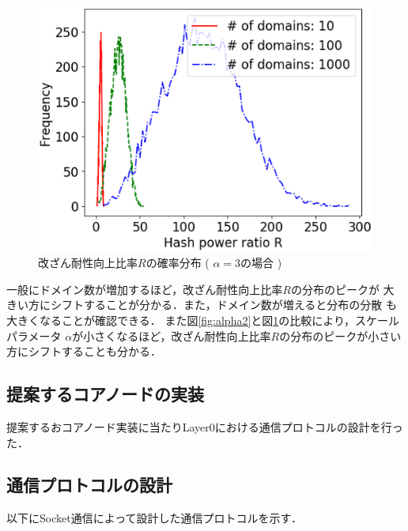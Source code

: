 \documentclass[a4paper,12pt]{jsarticle}
\begin{document}
\begin{figure}[tbh]
  \begin{center}
    \includegraphics{pht/hist-comp-R-alpha3.0-m1.0.eps}
  \end{center}
  \caption{改ざん耐性向上比率$R$の確率分布 ( $\alpha=3$の場合 ) }
  \label{fig:alpha3}
\end{figure}
%
一般にドメイン数が増加するほど，改ざん耐性向上比率$R$の分布のピークが
大きい方にシフトすることが分かる．また，ドメイン数が増えると分布の分散
も大きくなることが確認できる．
また図\ref{fig:alpha2}と図\ref{fig:alpha3}の比較により，スケールパラメータ
$\alpha$が小さくなるほど，改ざん耐性向上比率$R$の分布のピークが小さい方にシフトすることも分かる．

\subsection{提案するコアノードの実装}
提案するおコアノード実装に当たりLayer0における通信プロトコルの設計を行った．
\subsection{通信プロトコルの設計}

以下にSocket通信によって設計した通信プロトコルを示す．
\end{document}
